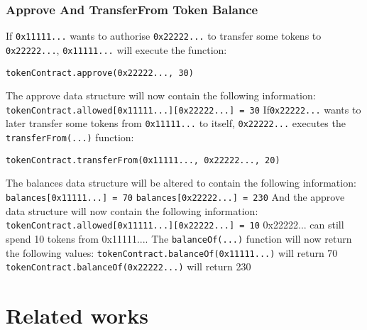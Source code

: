 \subsubsection{Approve And TransferFrom Token Balance}
If \texttt{0x11111...} wants to authorise \texttt{0x22222...} to transfer some tokens to \texttt{0x22222...}, \texttt{0x11111...} will execute the function:
\begin{lstlisting}[language=Solidity]
    tokenContract.approve(0x22222..., 30)
\end{lstlisting}
The approve data structure will now contain the following information:
\newline
\hspace*{4ex} \texttt{tokenContract.allowed[0x11111...][0x22222...] = 30}
\newline
If\texttt{0x22222...} wants to later transfer some tokens from \texttt{0x11111...} to itself, \texttt{0x22222...} executes the \texttt{transferFrom(...)} function:
\begin{lstlisting}[language=Solidity]
    tokenContract.transferFrom(0x11111..., 0x22222..., 20)
\end{lstlisting}
The balances data structure will be altered to contain the following information:
\newline
\hspace*{4ex} \texttt{balances[0x11111...] = 70}
\newline
\hspace*{4ex} \texttt{balances[0x22222...] = 230}
\newline
And the approve data structure will now contain the following information:
\newline
\hspace*{4ex} \texttt{tokenContract.allowed[0x11111...][0x22222...] = 10}
\newline
0x22222... can still spend 10 tokens from 0x11111....
The \texttt{balanceOf(...)} function will now return the following values:
\newline
\hspace*{4ex} \texttt{tokenContract.balanceOf(0x11111...)} will return 70
\newline
\hspace*{4ex} \texttt{tokenContract.balanceOf(0x22222...)} will return 230


\section{Related works}